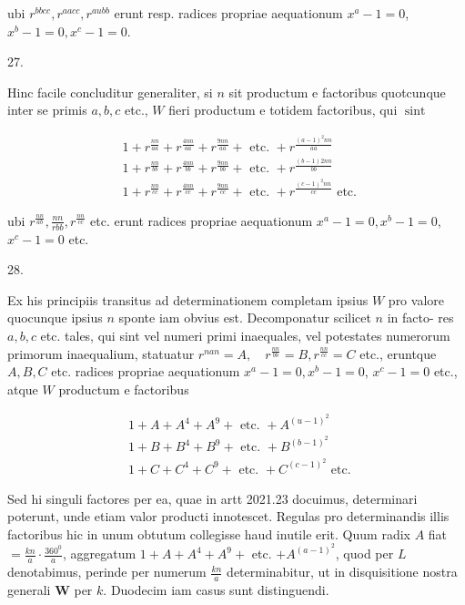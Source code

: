 \documentclass[10pt]{article}
\begin{document}
ubi \(r^{b b c c}, r^{a a c c}, r^{a u b b}\) erunt resp. radices propriae aequationum \(x^{a}-1=0\), \(x^{b}-1=0, x^{c}-1=0\).

27.

Hinc facile concluditur generaliter, si \(n\) sit productum e factoribus quotcunque inter se primis \(a, b, c\) etc., \(W\) fieri productum e totidem factoribus, qui \(\operatorname{sint}\)

\[
\begin{aligned}
& 1+r^{\frac{n n}{a a}}+r^{\frac{4 n n}{a a}}+r^{\frac{9 n n}{a a}}+\text { etc. }+r^{\frac{(a-1)^{2} n n}{a a}} \\
& 1+r^{\frac{n n}{b b}}+r^{\frac{4 n n}{b b}}+r^{\frac{9 n n}{b b}}+\text { etc. }+r^{\frac{(b-1) 2 n n}{b b}} \\
& 1+r^{\frac{n n}{c c}}+r^{\frac{4 n n}{c c}}+r^{\frac{9 n n}{c c}}+\text { etc. }+r^{\frac{(c-1)^{2} n n}{c c}} \text { etc. }
\end{aligned}
\]

ubi \(r^{\frac{n n}{a b}}, \frac{n n}{r b b}, r^{\frac{n n}{c c}}\) etc. erunt radices propriae aequationum \(x^{a}-1=0, x^{b}-1=0\), \(x^{c}-1=0\) etc.

28.

Ex his principiis transitus ad determinationem completam ipsius \(W\) pro valore quocunque ipsius \(n\) sponte iam obvius est. Decomponatur scilicet \(n\) in facto-
res \(a, b, c\) etc. tales, qui sint vel numeri primi inaequales, vel potestates numerorum primorum inaequalium, statuatur \(r^{n a n}=A, \quad r^{\frac{n n}{b b}}=B, r^{\frac{n n}{c c}}=C\) etc., eruntque \(A, B, C\) etc. radices propriae aequationum \(x^{a}-1=0, x^{b}-1=0\), \(x^{c}-1=0\) etc., atque \(W\) productum e factoribus

\[
\begin{aligned}
& 1+A+A^{4}+A^{9}+\text { etc. }+A^{(u-1)^{2}} \\
& 1+B+B^{4}+B^{9}+\text { etc. }+B^{(b-1)^{2}} \\
& 1+C+C^{4}+C^{9}+\text { etc. }+C^{(c-1)^{2}} \text { etc. }
\end{aligned}
\]

Sed hi singuli factores per ea, quae in artt 2021.23 docuimus, determinari poterunt, unde etiam valor producti innotescet. Regulas pro determinandis illis factoribus hic in unum obtutum collegisse haud inutile erit. Quum radix \(A\) fiat \(=\frac{k n}{a} \cdot \frac{360^{0}}{a}\), aggregatum \(1+A+A^{4}+A^{9}+\) etc. \(+A^{(a-1)^{2}}\), quod per \(L\) denotabimus, perinde per numerum \(\frac{k n}{a}\) determinabitur, ut in disquisitione nostra generali \(\boldsymbol{W}\) per \(k\). Duodecim iam casus sunt distinguendi.
\end{document}
